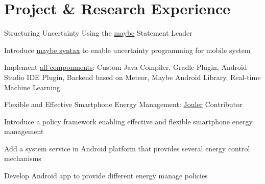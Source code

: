 
\section{Project \& Research Experience}



{Structuring Uncertainty Using the \href{http://blue.cse.buffalo.edu/projects/maybe}{maybe} Statement}
{Leader}
{}
{}
{
  \begin{tightitemize}
  \item Introduce \href{https://blue-systems-research-group.gitbooks.io/maybe/content/concepts.html}{maybe syntax} to enable uncertainty programming for mobile system
  \item Implement \href{https://blue-systems-research-group.gitbooks.io/maybe/content/}{all componments}: Custom Java Compiler, Gradle Plugin, Android Studio IDE Plugin, Backend based on Meteor, Maybe Android Library, Real-time Machine Learning
  \end{tightitemize}
}

{Flexible and Effective Smartphone Energy Management: \href{http://blue.cse.buffalo.edu/projects/jouler/}{Jouler}}
{Contributor}
{}
{}
{
  \begin{tightitemize}
  \item Introduce a policy framework enabling effective and flexible smartphone energy management
  \item Add a system service in Android platform that provides several energy control mechanisms
  \item Develop Android app to provide different energy manage policies
  \end{tightitemize}
}

